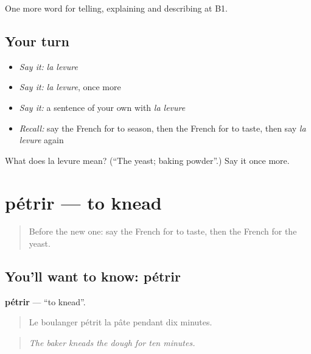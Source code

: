 \begin{grammarlens}[title={What you've built}]
One more word for telling, explaining and describing at B1.
\end{grammarlens}

\subsection*{Your turn}
\begin{itemize}
\raggedright
  \item \emph{Say it:} \emph{la levure}
  \item \emph{Say it:} \emph{la levure}, once more
  \item \emph{Say it:} a sentence of your own with \emph{la levure}
  \item \emph{Recall:} say the French for to season, then the French for to taste, then say \emph{la levure} again
\end{itemize}

\begin{tcolorbox}[breakable,colback=teal!4,colframe=teal!35!black,title={Before you move on}]
What does la levure mean? (\textquotedblleft{}The yeast; baking powder\textquotedblright{}.) Say it once more.
\end{tcolorbox}
\section[pétrir]{pétrir — to knead}

\label{lesson:FR-C333-petrir}



\begin{quote}
Before the new one: say the French for to taste, then the French for the yeast.
\end{quote}

\subsection*{You'll want to know: pétrir}
\textbf{pétrir} — \textquotedblleft{}to knead\textquotedblright{}.

\begin{quote}
Le boulanger pétrit la pâte pendant dix minutes.
\end{quote}

\begin{quote}
\emph{The baker kneads the dough for ten minutes.}
\end{quote}

